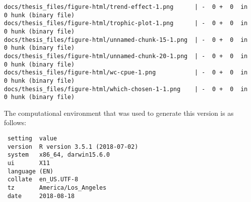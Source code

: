 \documentclass[twoside,12pt,final]{ucthesis-CA2012}
\begin{document}
\begin{ucmainmatter}
\begin{verbatim}
docs/thesis_files/figure-html/trend-effect-1.png      | -  0 +  0  in  0 hunk (binary file)
docs/thesis_files/figure-html/trophic-plot-1.png      | -  0 +  0  in  0 hunk (binary file)
docs/thesis_files/figure-html/unnamed-chunk-15-1.png  | -  0 +  0  in  0 hunk (binary file)
docs/thesis_files/figure-html/unnamed-chunk-20-1.png  | -  0 +  0  in  0 hunk (binary file)
docs/thesis_files/figure-html/wc-cpue-1.png           | -  0 +  0  in  0 hunk (binary file)
docs/thesis_files/figure-html/which-chosen-1-1.png    | -  0 +  0  in  0 hunk (binary file)
\end{verbatim}
The computational environment that was used to generate this version is
as follows:
\begin{verbatim}
 setting  value                       
 version  R version 3.5.1 (2018-07-02)
 system   x86_64, darwin15.6.0        
 ui       X11                         
 language (EN)                        
 collate  en_US.UTF-8                 
 tz       America/Los_Angeles         
 date     2018-08-18                  


\end{verbatim}
\end{ucmainmatter}
\end{document}
